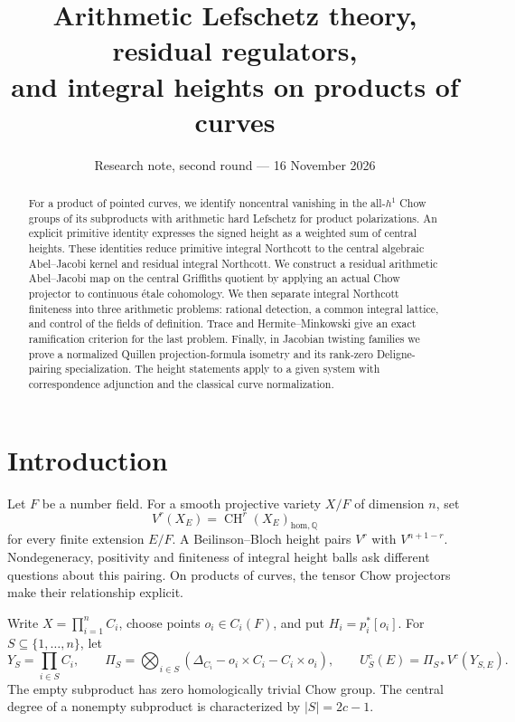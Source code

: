\documentclass[11pt,a4paper]{article}
\title{Arithmetic Lefschetz theory, residual regulators,\\
and integral heights on products of curves}
\author{}
\date{Research note, second round --- 16 November 2026}
\theoremstyle{definition}
\newcommand{\Q}{\mathbb Q}\newcommand{\R}{\mathbb R}\newcommand{\C}{\mathbb C}
\newcommand{\CH}{\operatorname{CH}}\newcommand{\Pic}{\operatorname{Pic}}
\newcommand{\homol}{\mathrm{hom}}\newcommand{\alg}{\mathrm{alg}}
\numberwithin{equation}{section}
\begin{document}
\maketitle
\begin{abstract}
For a product of pointed curves, we identify noncentral vanishing in
the all-\(h^1\) Chow groups of its subproducts with arithmetic hard
Lefschetz for product polarizations. An explicit primitive identity
expresses the signed height as a weighted sum of central heights.
These identities reduce primitive integral Northcott to the central
algebraic Abel--Jacobi kernel and residual integral Northcott.
We construct a residual arithmetic Abel--Jacobi map on the central
Griffiths quotient by applying an actual Chow projector to continuous
étale cohomology. We then separate integral Northcott finiteness into
three arithmetic problems: rational detection, a common integral
lattice, and control of the fields of definition. Trace and
Hermite--Minkowski give an exact ramification criterion for the last
problem. Finally, in Jacobian twisting families we prove a normalized
Quillen projection-formula isometry and its rank-zero Deligne-pairing
specialization. The height statements apply to a given system with
correspondence adjunction and the classical curve normalization.
\end{abstract}
{\hypersetup{linkcolor=MathSectionLink}\tableofcontents}

\section{Introduction}\label{sec:introduction}

Let \(F\) be a number field. For a smooth projective variety \(X/F\)
of dimension \(n\), set
\[
 V^r(X_E)=\CH^r(X_E)_{\homol,\Q}
\]
for every finite extension \(E/F\). A Beilinson--Bloch height pairs
\(V^r\) with \(V^{n+1-r}\). Nondegeneracy, positivity and finiteness
of integral height balls ask different questions about this pairing.
On products of curves, the tensor Chow projectors make their
relationship explicit.

Write \(X=\prod_{i=1}^n C_i\), choose points \(o_i\in C_i(F)\), and
put \(H_i=p_i^*[o_i]\). For \(S\subseteq\{1,\ldots,n\}\), let
\[
 Y_S=\prod_{i\in S}C_i,\qquad
 \Pi_S=\bigotimes_{i\in S}
  (\Delta_{C_i}-o_i\times C_i-C_i\times o_i),\qquad
 U_S^c(E)=\Pi_{S*}V^c(Y_{S,E}).
\]
The empty subproduct has zero homologically trivial Chow group.
The central degree of a nonempty subproduct is characterized by
\(|S|=2c-1\).
\end{document}

